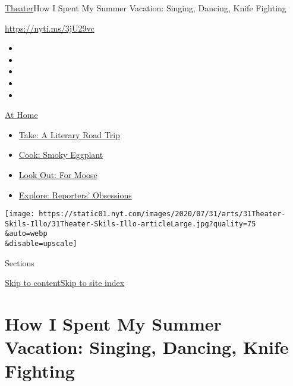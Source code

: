 \href{/section/theater}{Theater}\textbar{}How I Spent My Summer
Vacation: Singing, Dancing, Knife Fighting

\url{https://nyti.ms/3jU29vc}

\begin{itemize}
\item
\item
\item
\item
\item
\end{itemize}

\href{https://www.nytimes.com/spotlight/at-home?action=click\&pgtype=Article\&state=default\&region=TOP_BANNER\&context=at_home_menu}{At
Home}

\begin{itemize}
\tightlist
\item
  \href{https://www.nytimes.com/2020/07/28/books/time-for-a-literary-road-trip.html?action=click\&pgtype=Article\&state=default\&region=TOP_BANNER\&context=at_home_menu}{Take:
  A Literary Road Trip}
\item
  \href{https://www.nytimes.com/2020/07/29/magazine/bored-with-your-home-cooking-some-smoky-eggplant-will-fix-that.html?action=click\&pgtype=Article\&state=default\&region=TOP_BANNER\&context=at_home_menu}{Cook:
  Smoky Eggplant}
\item
  \href{https://www.nytimes.com/2020/07/27/travel/moose-michigan-isle-royale.html?action=click\&pgtype=Article\&state=default\&region=TOP_BANNER\&context=at_home_menu}{Look
  Out: For Moose}
\item
  \href{https://www.nytimes.com/interactive/2020/at-home/even-more-reporters-editors-diaries-lists-recommendations.html?action=click\&pgtype=Article\&state=default\&region=TOP_BANNER\&context=at_home_menu}{Explore:
  Reporters' Obsessions}
\end{itemize}

\texttt{[image: https://static01.nyt.com/images/2020/07/31/arts/31Theater-Skils-Illo/31Theater-Skils-Illo-articleLarge.jpg?quality=75\\\&auto=webp\\\&disable=upscale]}

Sections

\protect\hyperlink{site-content}{Skip to
content}\protect\hyperlink{site-index}{Skip to site index}

\hypertarget{how-i-spent-my-summer-vacation-singing-dancing-knife-fighting}{%
\section{How I Spent My Summer Vacation: Singing, Dancing, Knife
Fighting}\label{how-i-spent-my-summer-vacation-singing-dancing-knife-fighting}}

